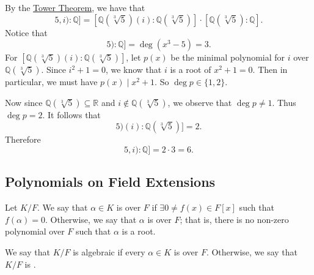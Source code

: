 \documentclass[notoc,notitlepage,nobib]{tufte-book}
\begin{document}
\begin{solution}
  By the \hyperref[thm:tower_theorem]{Tower Theorem}, we have that
  \begin{equation*}
    [\mathbb{Q}(\sqrt[3]{5}, i) : \mathbb{Q}] 
      = [\mathbb{Q}(\sqrt[3]{5})(i) : \mathbb{Q}(\sqrt[3]{5})] \cdot [\mathbb{Q}(\sqrt[3]{5}) : \mathbb{Q}].
  \end{equation*}
  Notice that
  \begin{equation*}
    [\mathbb{Q}(\sqrt[3]{5}) : \mathbb{Q}] = \deg ( x^3 - 5 ) = 3.
  \end{equation*}
  For $[\mathbb{Q}(\sqrt[3]{5})(i) : \mathbb{Q}(\sqrt[3]{5})]$, let $p(x)$ be the minimal polynomial for $i$
  over $\mathbb{Q}(\sqrt[3]{5})$. Since $i^2 + 1 = 0$, we know that $i$ is a root of $x^2 + 1 = 0$. Then in
  particular, we must have $p(x) \mid x^2 + 1$. So $\deg p \in \{ 1, 2 \}$.

  Now since $\mathbb{Q}(\sqrt[3]{5}) \subseteq \mathbb{R}$ and $i \notin \mathbb{Q}(\sqrt[3]{5})$, we observe
  that $\deg p \neq 1$. Thus $\deg p = 2$. It follows that
  \begin{equation*}
    [\mathbb{Q}(\sqrt[3]{5})(i) : \mathbb{Q}(\sqrt[3]{5})] = 2.
  \end{equation*}
  Therefore
  \begin{equation*}
    [\mathbb{Q}(\sqrt[3]{5}, i) : \mathbb{Q}]  = 2 \cdot 3 = 6.
  \end{equation*}
\end{solution}


\subsection{Polynomials on Field Extensions}%
\label{sub:polynomials_on_field_extensions}

\begin{defn}\label{defn:algebraic_and_transcendental}
  Let $K / F$. We say that $\alpha \in K$ is  over $F$ if $\exists 0 \neq f(x) \in F[x]$
  such that $f(\alpha) = 0$. Otherwise, we say that $\alpha$ is  over $F$; that is,
  there is no non-zero polynomial over $F$ such that $\alpha$ is a root.

  We say that $K / F$ is algebraic if every $\alpha \in K$ is  over $F$. Otherwise, we
  say that $K / F$ is .
\end{defn}
\end{document}
